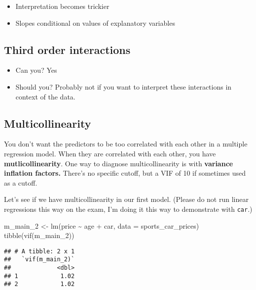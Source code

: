 \documentclass[
]{article}
\newenvironment{Shaded}{\begin{snugshade}}{\end{snugshade}}
\newcommand{\AttributeTok}[1]{\textcolor[rgb]{0.77,0.63,0.00}{#1}}
\newcommand{\FunctionTok}[1]{\textcolor[rgb]{0.00,0.00,0.00}{#1}}
\newcommand{\NormalTok}[1]{#1}
\newcommand{\OtherTok}[1]{\textcolor[rgb]{0.56,0.35,0.01}{#1}}
\newcommand{\SpecialCharTok}[1]{\textcolor[rgb]{0.00,0.00,0.00}{#1}}
\begin{document}
\begin{itemize}
\item
  Interpretation becomes trickier
\item
  Slopes conditional on values of explanatory variables
\end{itemize}

\hypertarget{third-order-interactions}{%
\subsection{Third order interactions}\label{third-order-interactions}}

\begin{itemize}
\item
  Can you? Yes
\item
  Should you? Probably not if you want to interpret these interactions
  in context of the data.
\end{itemize}

\hypertarget{multicollinearity}{%
\subsection{Multicollinearity}\label{multicollinearity}}

You don't want the predictors to be too correlated with each other in a
multiple regression model. When they are correlated with each other, you
have \textbf{mutlicollinearity}. One way to diagnose multicollinearity
is with \textbf{variance inflation factors.} There's no specific cutoff,
but a VIF of 10 if sometimes used as a cutoff.

Let's see if we have multicollinearity in our first model. (Please do
not run linear regressions this way on the exam, I'm doing it this way
to demonstrate with \texttt{car}.)

\begin{Shaded}
\begin{Highlighting}[]
\NormalTok{m\_main\_2 }\OtherTok{\textless{}{-}} \FunctionTok{lm}\NormalTok{(price }\SpecialCharTok{\textasciitilde{}}\NormalTok{ age }\SpecialCharTok{+}\NormalTok{ car, }\AttributeTok{data =}\NormalTok{ sports\_car\_prices)}
\FunctionTok{tibble}\NormalTok{(}\FunctionTok{vif}\NormalTok{(m\_main\_2))}
\end{Highlighting}
\end{Shaded}

\begin{verbatim}
## # A tibble: 2 x 1
##   `vif(m_main_2)`
##             <dbl>
## 1            1.02
## 2            1.02
\end{verbatim}
\end{document}
